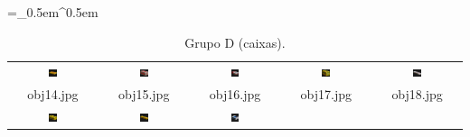 \begin{table}[H]
  \centering
  \caption{Grupo D (caixas).}
  \tabulinesep =_0.5em^0.5em
  \everyrow{\tabucline[0.4pt]-}
  \begin{tabu}{|ccccc|}
    \includegraphics[width=0.1\textwidth,height=0.1\textwidth]{imagens/coil_100/caixas/obj1__35.png} &
    \includegraphics[width=0.1\textwidth,height=0.1\textwidth]{imagens/coil_100/caixas/obj31__45.png} &
    \includegraphics[width=0.1\textwidth,height=0.1\textwidth]{imagens/coil_100/caixas/obj46__45.png} &
    \includegraphics[width=0.1\textwidth,height=0.1\textwidth]{imagens/coil_100/caixas/obj54__55.png} &
    \includegraphics[width=0.1\textwidth,height=0.1\textwidth]{imagens/coil_100/caixas/obj67__50.png}
    \\
    \scriptsize{obj14.jpg} & \scriptsize{obj15.jpg} & \scriptsize{obj16.jpg} &
    \scriptsize{obj17.jpg} & \scriptsize{obj18.jpg}
    \\
    \includegraphics[width=0.1\textwidth,height=0.1\textwidth]{imagens/coil_100/caixas/obj79__45.png} &
    \includegraphics[width=0.1\textwidth,height=0.1\textwidth]{imagens/coil_100/caixas/obj84__45.png} &
    \includegraphics[width=0.1\textwidth,height=0.1\textwidth]{imagens/coil_100/caixas/obj96__45.png} &

\end{tabu}
\end{table}
